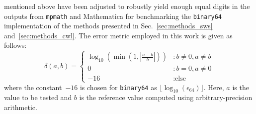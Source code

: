 mentioned above have been adjusted to robustly yield enough equal digits
in the outputs from \texttt{mpmath} and Mathematica for benchmarking the \texttt{binary64} implementation of the methods presented in Sec.~\ref{sec:methods_sws} and~\ref{sec:methods_cwl}.
The error metric employed in this work is given as follows:
\begin{equation}
 \delta(a, b)
 = \begin{cases}
    \log_{10} \left(\min\left(1, \left| \frac{a - b}{b} \right|\right) \right) &: b \neq 0, a \neq b \\
    0                                                                          &: b=0, a \neq 0 \\
    -16                                                                        &: \textrm{else}
   \end{cases} \label{eqn:error_metric}
\end{equation}
where the constant~$-16$ is chosen for \texttt{binary64} as $\lfloor \log_{10}(\epsilon_{64}) \rfloor$.
Here, $a$ is the value to be tested and
$b$ is the reference value computed using arbitrary-precision arithmetic.
